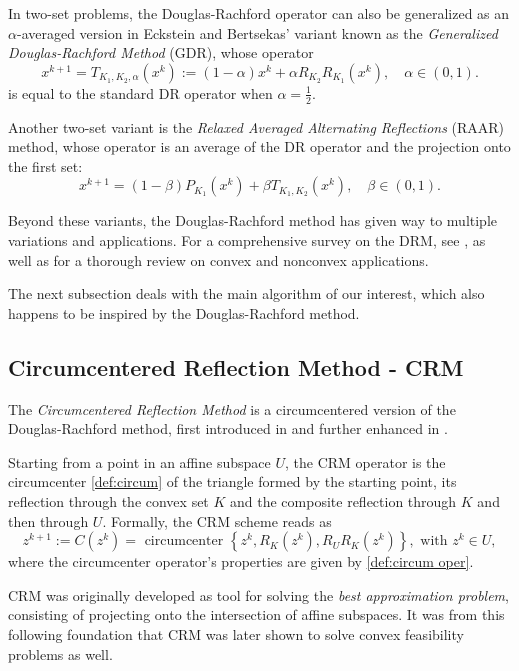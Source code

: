 \documentclass[smallextended,numbook,nospthms]{svjour3}
\theoremstyle{plain}
\theoremstyle{definition}
\begin{document}
In two-set problems, the Douglas-Rachford operator can also be generalized as an $\alpha$-averaged version in Eckstein and Bertsekas' \cite{Eckstein:1992} variant known as the \emph{Generalized Douglas-Rachford Method} (GDR), whose operator
$$
x^{k+1}=T_{K_1, K_2, \alpha}\left(x^{k}\right):=(1-\alpha) x^{k}+\alpha R_{K_2} R_{K_1}\left(x^{k}\right), \quad \alpha \in (0,1).
$$
is equal to the standard DR operator when $\alpha=\frac{1}{2}$.

Another two-set variant is the \emph{Relaxed Averaged Alternating Reflections} (RAAR) \cite{Luke:2005} method, whose operator is an average of the DR operator and the projection onto the first set:
$$
x^{k+1}=(1-\beta) P_{K_1}\left(x^{k}\right)+\beta T_{K_1, K_2}\left(x^{k}\right), \quad \beta \in (0,1).
$$

Beyond these variants, the Douglas-Rachford method has given way to multiple variations and applications. For a comprehensive survey on the DRM, see \cite{Lindstrom:2018uc}, as well as \cite{AragonArtacho:2019ug} for a thorough review on convex and nonconvex applications.

The next subsection deals with the main algorithm of our interest, which also happens to be inspired by the Douglas-Rachford method.

\newpage
\subsection{Circumcentered Reflection Method - CRM}\label{subsec:CRM}

The \emph{Circumcentered Reflection Method} is a circumcentered version of the Douglas-Rachford method, first introduced in \cite{Behling:2018a,Behling:2018} and further enhanced in \cite{Arefidamghani:2020,Bauschke:2018ut,Bauschke:2018wa, Bauschke:2019uh,Bauschke:2020a,Behling:2019dj,Behling:2020,Dizon:2019vq,Dizon:2020a,Ouyang:2018gu,Lindstrom:2020a}.

Starting from a point in an affine subspace $U$, the CRM operator is the circumcenter \cref{def:circum} of the triangle formed by the starting point, its reflection through the convex set $K$ and the composite reflection through $K$ and then through $U$. Formally, the CRM scheme reads as
\[
z^{k+1}:=C\left(z^{k}\right)=\text { circumcenter }\left\{z^{k}, R_{K}\left(z^{k}\right), R_{U} R_{K}\left(z^{k}\right)\right\}, \text { with } z^{k} \in U \label{eq:CRM},
\]
where the circumcenter operator's properties are given by \cref{def:circum oper}.

CRM was originally developed as tool for solving the \emph{best approximation problem}, consisting of projecting onto the intersection of affine subspaces. It was from this following foundation that CRM was later shown to solve convex feasibility problems as well.
\end{document}
